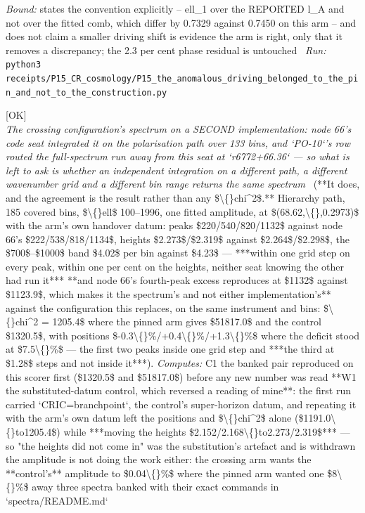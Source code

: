 \begin{description}
 \emph{Bound:} states the convention explicitly -- ell\_1 over the REPORTED l\_A and not over the fitted comb, which differ by 0.7329 against 0.7450 on this arm -- and does not claim a smaller driving shift is evidence the arm is right, only that it removes a discrepancy; the 2.3 per cent phase residual is untouched
\ \emph{Run:} \texttt{python3 receipts/P15\_CR\_cosmology/P15\_the\_anomalous\_driving\_belonged\_to\_the\_pin\_and\_not\_to\_the\_construction.py}
\item[\rcptlabel{P15_the_crossing_spectrum_reproduces_on_a_second_instrument_and_the_172_is_the_radiation_free_ruler}{P15R166}\textbf{P15R166}\quad\texttt{P15\_the\_crossing\_spectrum\_reproduces\_on\_a\_second\_instrument\_and\_the\_172\_is\_the\_radiation\_free\_ruler}]\hfill\textsf{[OK]}\\
\textit{The crossing configuration's spectrum on a SECOND implementation: node 66's code seat integrated it on the polarisation path over 133 bins, and `PO-10`'s row routed the full-spectrum run away from this seat at `r6772+66.36` --- so what is left to ask is whether an independent integration on a different path, a different wavenumber grid and a different bin range returns the same spectrum} \ (**It does, and the agreement is the result rather than any \$\textbackslash\{\}chi\textasciicircum{}2\$.** Hierarchy path, 185 covered bins, \$\textbackslash\{\}ell\$ 100--1996, one fitted amplitude, at \$(68.62,\textbackslash\{\},0.2973)\$ with the arm's own handover datum: peaks \$220/540/820/1132\$ against node 66's \$222/538/818/1134\$, heights \$2.273\$/\$2.319\$ against \$2.264\$/\$2.298\$, the \$700\$--\$1000\$ band \$4.02\$ per bin against \$4.23\$ --- ***within one grid step on every peak, within one per cent on the heights, neither seat knowing the other had run it***  **and node 66's fourth-peak excess reproduces at \$1132\$ against \$1123.9\$, which makes it the spectrum's and not either implementation's**  against the configuration this replaces, on the same instrument and bins: \$\textbackslash\{\}chi\textasciicircum{}2 = 1205.4\$ where the pinned arm gives \$51817.0\$ and the control \$1320.5\$, with positions \$-0.3\textbackslash\{\}\%/+0.4\textbackslash\{\}\%/+1.3\textbackslash\{\}\%\$ where the deficit stood at \$7.5\textbackslash\{\}\%\$ --- the first two peaks inside one grid step and ***the third at \$1.28\$ steps and not inside it***). 
\emph{Computes:} C1 the banked pair reproduced on this scorer first (\$1320.5\$ and \$51817.0\$) before any new number was read  **W1 the substituted-datum control, which reversed a reading of mine**: the first run carried `CRIC=branchpoint`, the control's super-horizon datum, and repeating it with the arm's own datum left the positions and \$\textbackslash\{\}chi\textasciicircum{}2\$ alone (\$1191.0\textbackslash\{\}to1205.4\$) while ***moving the heights \$2.152/2.168\textbackslash\{\}to2.273/2.319\$*** --- so "the heights did not come in" was the substitution's artefact and is withdrawn  the amplitude is not doing the work either: the crossing arm wants the **control's** amplitude to \$0.04\textbackslash\{\}\%\$ where the pinned arm wanted one \$8\textbackslash\{\}\%\$ away  three spectra banked with their exact commands in `spectra/README.md`

\end{description}
